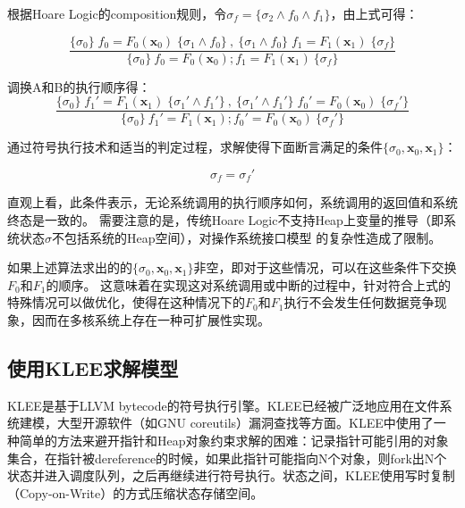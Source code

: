 根据Hoare Logic的composition规则，令$\sigma_f = \{\sigma_2 \land f_0 \land
	f_1 \}$，由上式可得：

\begin{equation}
\label{eq:hoare2}
\frac
{ \{ \sigma_0 \} \; f_0 = F_0(\boldsymbol{x}_0) \; \{\sigma_1 \land f_0 \}\ , \
\{ \sigma_1 \land f_0 \} \; f_1 = F_1(\boldsymbol{x}_1) \; \{ \sigma_f \} }
{\{ \sigma_0 \}\ f_0 = F_0(\boldsymbol{x}_0);f_1 = F_1(\boldsymbol{x}_1) \ \{ \sigma_f
\}}
\end{equation}

调换A和B的执行顺序得：
\begin{equation}
\label{eq:hoare3}
\frac
{ \{ \sigma_0 \} \; f_1' = F_1(\boldsymbol{x}_1) \; \{\sigma_1' \land f_1' \}\ , \
\{ \sigma_1' \land f_1' \} \; f_0' = F_0(\boldsymbol{x}_0) \; \{ \sigma_f' \} }
{\{ \sigma_0 \}\ f_1' = F_1(\boldsymbol{x}_1);f_0' = F_0(\boldsymbol{x}_0) \
\{ \sigma_f' \}}
\end{equation}

通过符号执行技术和适当的判定过程，求解使得下面断言满足的条件$\{\sigma_0,\boldsymbol{x}_0,
\boldsymbol{x}_1\}$：

\begin{equation}
\label{eq:hoare4}
\sigma_f = \sigma_f'
\end{equation}

直观上看，此条件表示，无论系统调用的执行顺序如何，系统调用的返回值和系统终态是一致的。
需要注意的是，传统Hoare
Logic不支持Heap上变量的推导（即系统状态$\sigma$不包括系统的Heap空间），对操作系统接口模型
的复杂性造成了限制。

如果上述算法求出的的$\{\sigma_0,\boldsymbol{x}_0,
\boldsymbol{x}_1\}$非空，即对于这些情况，可以在这些条件下交换$F_0$和$F_1$的顺序。
这意味着在实现这对系统调用或中断的过程中，针对符合上式的特殊情况可以做优化，使得在这种情况下的$F_0$和$F_1$执行不会发生任何数据竞争现象，因而在多核系统上存在一种可扩展性实现。



\subsection{使用KLEE求解模型}
KLEE是基于LLVM
bytecode的符号执行引擎。KLEE已经被广泛地应用在文件系统建模，大型开源软件（如GNU
coreutils）漏洞查找\cite{Cadar:2008:KUA:1855741.1855756}等方面。KLEE中使用了一种简单的方法来避开指针和Heap对象约束求解的困难：记录指针可能引用的对象集合，在指针被dereference的时候，如果此指针可能指向N个对象，则fork出N个状态并进入调度队列，之后再继续进行符号执行。状态之间，KLEE使用写时复制（Copy-on-Write）的方式压缩状态存储空间。



